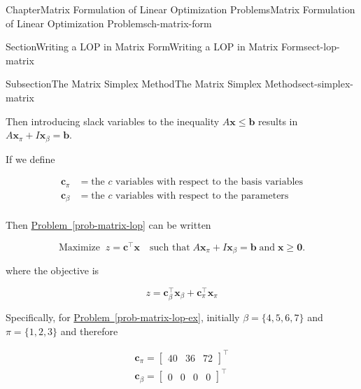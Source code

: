 \documentclass[oneside,10pt,]{book}
\newcommand{\xreffont}{\relax}
\numberwithin{equation}{section}
\newcommand{\amp}{&}
\begin{document}
\begin{chapterptx}{Chapter}{Matrix Formulation of Linear Optimization Problems}{}{Matrix Formulation of Linear Optimization Problems}{}{}{ch-matrix-form}
\begin{sectionptx}{Section}{Writing a LOP in Matrix Form}{}{Writing a LOP in Matrix Form}{}{}{sect-lop-matrix}
\begin{subsectionptx}{Subsection}{The Matrix Simplex Method}{}{The Matrix Simplex Method}{}{}{sect-simplex-matrix}
\begin{equation*}
\end{equation*}
%
\par
Then introducing slack variables to the inequality \(A \boldsymbol{x} \leq \boldsymbol{b}\) results in \(A\boldsymbol{x}_{\pi} + I \boldsymbol{x}_{\beta} = \boldsymbol{b}\).%
\par
If we define%
\par
%
\begin{equation*}
\begin{aligned} \boldsymbol{c}_{\pi} \amp = \text{the $c$ variables with respect to the basis variables} \\ \boldsymbol{c}_{\beta} \amp = \text{the $c$ variables with respect to the parameters} \\ \end{aligned}
\end{equation*}
%
\par
Then \hyperref[prob-matrix-lop]{Problem~{\xreffont\ref{prob-matrix-lop}}} can be written%
\par
%
\begin{equation}
\text{Maximize}\;\; z = \boldsymbol{c}^{\intercal} \boldsymbol{x} \quad \text{such that} \; A\boldsymbol{x}_{\pi} + I \boldsymbol{x}_{\beta} = \boldsymbol{b} \; \text{and} \; \boldsymbol{x} \geq \boldsymbol{0}.\label{eq-prob-matrix-lop-compact}
\end{equation}
%
\par
where the objective is%
\par
%
\begin{equation*}
z = \boldsymbol{c}_{\beta}^{\intercal}\boldsymbol{x}_{\beta} + \boldsymbol{c}_{\pi}^{\intercal}\boldsymbol{x}_{\pi}
\end{equation*}
%
\par
Specifically, for \hyperref[prob-matrix-lop-ex]{Problem~{\xreffont\ref{prob-matrix-lop-ex}}}, initially \(\beta = \{4,5,6,7\}\) and \(\pi = \{1,2,3\}\) and therefore%
\par
%
\begin{equation*}
\begin{aligned} \boldsymbol{c}_{\pi} = \begin{bmatrix} 40 \amp 36 \amp 72 \end{bmatrix}^{\intercal} \\ \boldsymbol{c}_{\beta} = \begin{bmatrix} 0 \amp 0 \amp 0 \amp 0 \end{bmatrix}^{\intercal} \\ \end{aligned}

\end{equation*}
\end{subsectionptx}
\end{sectionptx}
\end{chapterptx}
\end{document}
